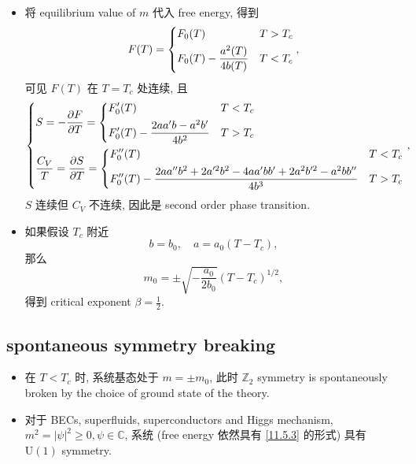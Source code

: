 \begin{itemize}
	\item 将 equilibrium value of $m$ 代入 free energy, 得到
	\begin{equation}
		F(T) = \begin{dcases}
			F_0(T) & T > T_c \\
			F_0(T) - \frac{a^2(T)}{4 b(T)} & T < T_c
		\end{dcases},
	\end{equation}
	可见 $F(T)$ 在 $T = T_c$ 处连续, 且
	\begin{equation}
		\begin{dcases}
			S = - \frac{\partial F}{\partial T} = \begin{dcases}
				F_0'(T) & T < T_c \\
				F_0'(T) - \frac{2 a a' b - a^2 b'}{4 b^2} & T > T_c
			\end{dcases} \\
			\frac{C_V}{T} = \frac{\partial S}{\partial T} = \begin{dcases}
				F_0''(T) & T < T_c \\
				F_0''(T) - \frac{2 a a'' b^2 + 2 a'^2 b^2 - 4 a a' b b' + 2 a^2 b'^2 - a^2 b b''}{4 b^3} & T > T_c
			\end{dcases}
		\end{dcases},
	\end{equation}
	$S$ 连续但 $C_V$ 不连续, 因此是 second order phase transition.
	
	\item 如果假设 $T_c$ 附近
	\begin{equation}
		b = b_0, \quad a = a_0 (T - T_c),
	\end{equation}
	 那么
	 \begin{equation}
	 	m_0 = \pm \sqrt{- \frac{a_0}{2 b_0}} (T - T_c)^{1 / 2},
	 \end{equation}
	 得到 critical exponent $\beta = \frac{1}{2}$.
\end{itemize}

\subsection{spontaneous symmetry breaking}
\begin{itemize}
	\item 在 $T < T_c$ 时, 系统基态处于 $m = \pm m_0$, 此时 $\mathbb{Z}_2$ symmetry is spontaneously broken by the choice of ground state of the theory.
	
	\item 对于 BECs, superfluids, superconductors and Higgs mechanism, $m^2 = |\psi|^2 \geq 0, \psi \in \mathbb{C}$, 系统 (free energy 依然具有 \eqref{11.5.3} 的形式) 具有 $\mathrm{U}(1)$ symmetry.
\end{itemize}

